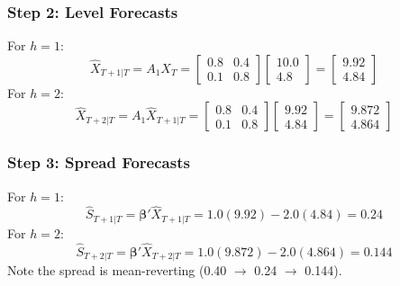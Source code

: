 \documentclass[10pt,a4paper,twocolumn]{article}
\newcommand{\bbeta}{\boldsymbol{\beta}}
\begin{document}
\subsubsection{Step 2: Level Forecasts}
For $h=1$:
\[
  \hat{X}_{T+1|T} = A_1 X_T = \begin{bmatrix} 0.8 & 0.4 \\ 0.1 & 0.8 \end{bmatrix} \begin{bmatrix} 10.0 \\ 4.8 \end{bmatrix} = \begin{bmatrix} 9.92 \\ 4.84 \end{bmatrix}
\]
For $h=2$:
\[
  \hat{X}_{T+2|T} = A_1 \hat{X}_{T+1|T} = \begin{bmatrix} 0.8 & 0.4 \\ 0.1 & 0.8 \end{bmatrix} \begin{bmatrix} 9.92 \\ 4.84 \end{bmatrix} = \begin{bmatrix} 9.872 \\ 4.864 \end{bmatrix}
\]

\subsubsection{Step 3: Spread Forecasts}
For $h=1$:
\[
  \hat{S}_{T+1|T} = \bbeta' \hat{X}_{T+1|T} = 1.0(9.92) - 2.0(4.84) = 0.24
\]
For $h=2$:
\[
  \hat{S}_{T+2|T} = \bbeta' \hat{X}_{T+2|T} = 1.0(9.872) - 2.0(4.864) = 0.144
\]
Note the spread is mean-reverting (0.40 $\to$ 0.24 $\to$ 0.144).
\end{document}
